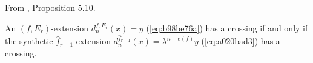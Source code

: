 \begin{proposition}
\label{paper:5.10}
From \cite{LWX126}, Proposition 5.10.\par
\label{prop:cross-f-Er}
    An $(f,E_r)$-extension $d_{n}^{f,E_r}(x)=y$ (\ref{eq:b98be76a}) has a crossing if and only if the synthetic $\hat f_{r-1}$-extension $d_{n}^{\hat f_{r-1}}(x)=\lambda^{n-e(f)} y$ (\ref{eq:a020bad3}) has a crossing.





\sketch
\end{proposition}
